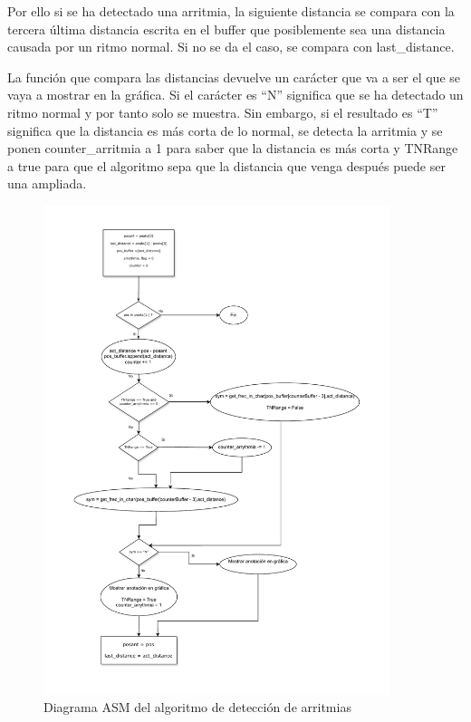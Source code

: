 Por ello si se ha detectado una arritmia, la siguiente distancia se compara con
la tercera última distancia escrita en el buffer que posiblemente sea una distancia causada por un ritmo normal. 
Si no se da el caso, se compara con last\_distance.

La función que compara las distancias devuelve un carácter que va a ser el que se vaya a mostrar en la gráfica. 
Si el carácter es ``N'' significa que se ha detectado un ritmo normal y por tanto solo se muestra. Sin embargo, si el 
resultado es ``T'' significa que la distancia es más corta de lo normal, se detecta la arritmia y se ponen
counter\_arritmia a 1 para saber que la distancia es más corta y TNRange a true para que el algoritmo sepa 
que la distancia que venga después puede ser una ampliada. 

\begin{figure}[h!]
	\centering
    \includegraphics[width=0.9\textwidth]{./Images/img_algoritmo/Diagramaarritmias.pdf}
    \caption{Diagrama ASM del algoritmo de detección de arritmias}
    \label{fig:diagramaarritmias}
\end{figure} 

